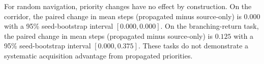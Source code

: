 For random navigation, priority changes have no effect by construction. On the corridor, the paired change in mean steps (propagated minus source-only) is $0.000$ with a 95\% seed-bootstrap interval $[0.000,0.000]$. On the branching-return task, the paired change in mean steps (propagated minus source-only) is $0.125$ with a 95\% seed-bootstrap interval $[0.000,0.375]$. These tasks do not demonstrate a systematic acquisition advantage from propagated priorities.
